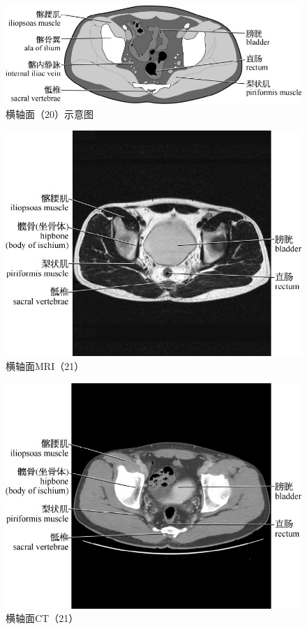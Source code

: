 \begin{figure}[!htbp]
 \centering
 \includegraphics{./images/Image00061.jpg}
 \captionsetup{justification=centering}
 \caption{横轴面（20）示意图}
  \end{figure} 
 \FloatBarrier

\begin{figure}[!htbp]
 \centering
 \includegraphics{./images/Image00062.jpg}
 \captionsetup{justification=centering}
 \caption{横轴面MRI（21）}
  \end{figure} 
 \FloatBarrier

\begin{figure}[!htbp]
 \centering
 \includegraphics{./images/Image00063.jpg}
 \captionsetup{justification=centering}
 \caption{横轴面CT（21）}
  \end{figure} 
 \FloatBarrier

